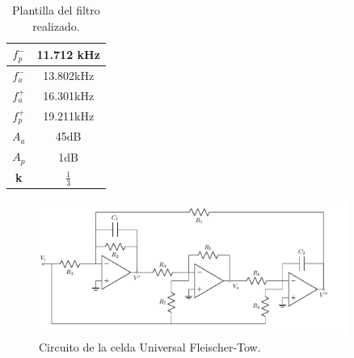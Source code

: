 







\tableofcontents
\newpage

\begin{table}[]
\centering
\begin{tabular}{|c|c|}
\hline
\textbf{$f_p^-$} & 11.712 kHz   \\ \hline
\textbf{$f_a^-$} & 13.802kHz    \\ \hline
\textbf{$f_a^+$} & 16.301kHz    \\ \hline
\textbf{$f_p^+$} & 19.211kHz    \\ \hline
\textbf{$A_a$}   & 45dB         \\ \hline
\textbf{$A_p$}   & 1dB          \\ \hline
\textbf{k}       & $\frac{1}{3}$ \\ \hline
\end{tabular}
\caption{Plantilla del filtro realizado.}
\end{table}

\begin{figure}[H]
\centering
	\includegraphics[width=0.9\textwidth]{Imagenes/FT.pdf}
	\caption{Circuito de la celda Universal Fleischer-Tow.}
\label{fig:circft}
\end{figure}

